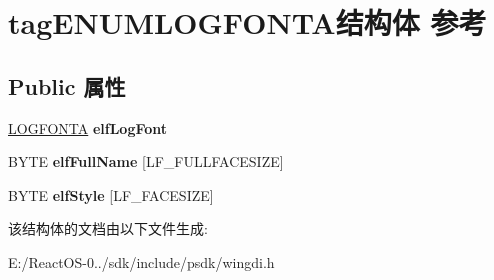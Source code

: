 \hypertarget{structtag_e_n_u_m_l_o_g_f_o_n_t_a}{}\section{tag\+E\+N\+U\+M\+L\+O\+G\+F\+O\+N\+T\+A结构体 参考}
\label{structtag_e_n_u_m_l_o_g_f_o_n_t_a}
\subsection*{Public 属性}
\begin{DoxyCompactItemize}
\item 
\mbox{\label{structtag_e_n_u_m_l_o_g_f_o_n_t_a_acb87cf7d352a1a1de76efed503f853cf}} 
\hyperlink{struct_l_o_g_f_o_n_t_a}{L\+O\+G\+F\+O\+N\+TA} {\bfseries elf\+Log\+Font}
\item 
\mbox{\label{structtag_e_n_u_m_l_o_g_f_o_n_t_a_ae7850e055314cb23fef41fc7889319c1}} 
B\+Y\+TE {\bfseries elf\+Full\+Name} \mbox{[}L\+F\+\_\+\+F\+U\+L\+L\+F\+A\+C\+E\+S\+I\+ZE\mbox{]}
\item 
\mbox{\label{structtag_e_n_u_m_l_o_g_f_o_n_t_a_a132e492eeb77f061c98858fa6ad78bf2}} 
B\+Y\+TE {\bfseries elf\+Style} \mbox{[}L\+F\+\_\+\+F\+A\+C\+E\+S\+I\+ZE\mbox{]}
\end{DoxyCompactItemize}


该结构体的文档由以下文件生成\+:\begin{DoxyCompactItemize}
\item 
E\+:/\+React\+O\+S-\/0../sdk/include/psdk/wingdi.\+h\end{DoxyCompactItemize}
